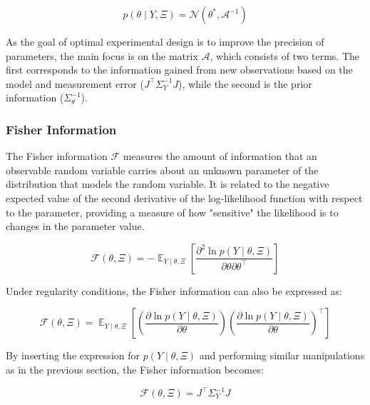 \documentclass[a4paper,fleqn]{cas-dc}
\begin{document}
		{\footnotesize \begin{equation} p\left(\theta \mid Y, \Xi \right) = \mathcal{N}\left( \theta^*, \mathcal{A}^{-1} \right) \end{equation} }
		
		As the goal of optimal experimental design is to improve the precision of parameters, the main focus is on the matrix $\mathcal{A}$, which consists of two terms. The first corresponds to the information gained from new observations based on the model and measurement error ($J^\top \Sigma_Y^{-1} J$), while the second is the prior information ($\Sigma_\theta^{-1}$).
		
		\subsubsection{Fisher Information}
		
		The Fisher information $\mathcal{F}$ measures the amount of information that an observable random variable carries about an unknown parameter of the distribution that models the random variable. It is related to the negative expected value of the second derivative of the log-likelihood function with respect to the parameter, providing a measure of how "sensitive" the likelihood is to changes in the parameter value.
		
		{\footnotesize \begin{equation} \mathcal{F}(\theta, \Xi) = -\mathop{\mathbb{E}}_{Y \mid \theta, \Xi} \left[ \frac{\partial^2 \ln p \left( Y \mid \theta, \Xi \right)}{\partial \theta \partial \theta^\top} \right] \end{equation} }
		
		Under regularity conditions, the Fisher information can also be expressed as:
		
		{\footnotesize \begin{equation} \mathcal{F}(\theta, \Xi) = \mathop{\mathbb{E}}_{Y \mid \theta, \Xi} \left[ \left( \frac{\partial \ln p\left( Y \mid \theta, \Xi \right)}{\partial \theta} \right) \left( \frac{\partial \ln p\left( Y \mid \theta, \Xi \right)}{\partial \theta} \right)^\top \right] \end{equation} }
		
		By inserting the expression for $p\left( Y \mid \theta, \Xi \right)$ and performing similar manipulations as in the previous section, the Fisher information becomes:
		
		{\footnotesize \begin{equation} \mathcal{F}(\theta, \Xi) = J^\top \Sigma_Y^{-1} J \end{equation} }
		
\end{document}
